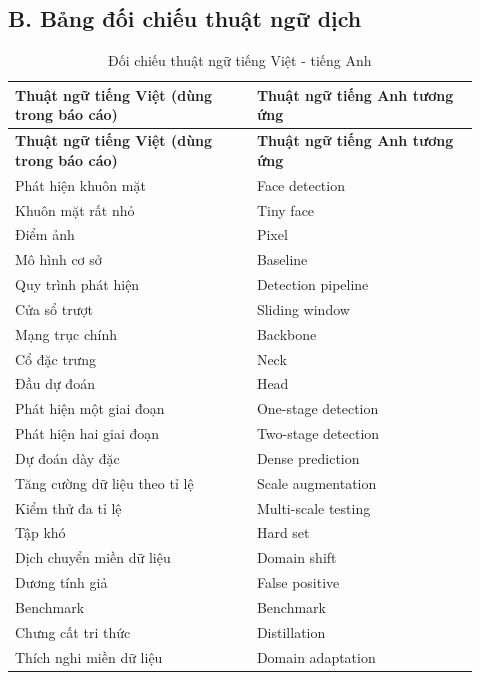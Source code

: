 \clearpage

\subsection*{B. Bảng đối chiếu thuật ngữ dịch}
\begingroup
\renewcommand{\arraystretch}{1.15}
\setlength{\tabcolsep}{4pt}
\small
\begin{longtable}{>{\RaggedRight\arraybackslash}p{0.48\linewidth} >{\RaggedRight\arraybackslash}p{0.44\linewidth}}
\caption{Đối chiếu thuật ngữ tiếng Việt - tiếng Anh}\label{tab:glossary-terms}\\
\toprule
\textbf{Thuật ngữ tiếng Việt (dùng trong báo cáo)} & \textbf{Thuật ngữ tiếng Anh tương ứng} \\
\midrule
\endfirsthead

\toprule
\textbf{Thuật ngữ tiếng Việt (dùng trong báo cáo)} & \textbf{Thuật ngữ tiếng Anh tương ứng} \\
\midrule
\endhead

\bottomrule
\endfoot

\bottomrule
\endlastfoot
Phát hiện khuôn mặt & Face detection \\
Khuôn mặt rất nhỏ & Tiny face \\
Điểm ảnh & Pixel \\
Mô hình cơ sở & Baseline \\
Quy trình phát hiện & Detection pipeline \\
Cửa sổ trượt & Sliding window \\
Mạng trục chính & Backbone \\
Cổ đặc trưng & Neck \\
Đầu dự đoán & Head \\
Phát hiện một giai đoạn & One-stage detection \\
Phát hiện hai giai đoạn & Two-stage detection \\
Dự đoán dày đặc & Dense prediction \\
Tăng cường dữ liệu theo tỉ lệ & Scale augmentation \\
Kiểm thử đa tỉ lệ & Multi-scale testing \\
Tập khó & Hard set \\
Dịch chuyển miền dữ liệu & Domain shift \\
Dương tính giả & False positive \\
Benchmark & Benchmark \\
Chưng cất tri thức & Distillation \\
Thích nghi miền dữ liệu & Domain adaptation \\
\end{longtable}
\endgroup

